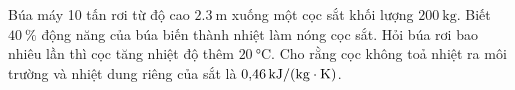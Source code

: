 \begin{ex}
	Búa máy 10 tấn rơi từ độ cao $\SI{2.3}{\meter}$ xuống một cọc sắt khối lượng $\SI{200}
	{\kilogram}$. Biết $\SI{40}{\percent}$ động năng của búa biến thành nhiệt làm nóng cọc sắt. Hỏi búa rơi bao nhiêu lần thì cọc tăng nhiệt độ thêm $\SI{20}{\celsius}$. Cho rằng cọc không toả nhiệt ra môi trường và nhiệt dung riêng của sắt là $\SI{0.46}{\kilo\joule/\left(\kilogram\cdot\kelvin\right)}$.
\end{ex}

